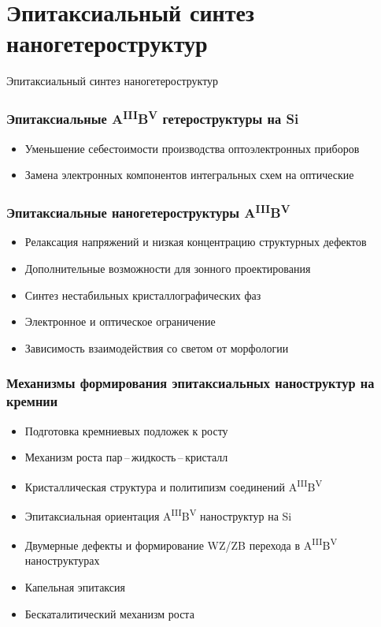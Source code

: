 \section{Эпитаксиальный синтез наногетероструктур}

\begin{frame}
	\begin{center}
		\Huge
		Эпитаксиальный синтез наногетероструктур
	\end{center}
\end{frame}

\begin{frame}
	\frametitle{Эпитаксиальные A\textsuperscript{III}B\textsuperscript{V} гетероструктуры на Si}
	\begin{itemize}
		\large
		\item Уменьшение себестоимости производства оптоэлектронных приборов
		\item Замена электронных компонентов интегральных схем на оптические
	\end{itemize}
\end{frame}

\begin{frame}
	\frametitle{Эпитаксиальные наногетероструктуры A\textsuperscript{III}B\textsuperscript{V}}
	\begin{itemize}
		\large
		\item Релаксация напряжений и низкая концентрацию структурных дефектов
		\item Дополнительные возможности для зонного проектирования
		\item Синтез нестабильных кристаллографических фаз
		\item Электронное и оптическое ограничение
		\item Зависимость взаимодействия со светом от морфологии
	\end{itemize}
\end{frame}

\begin{frame}
	\frametitle{Механизмы формирования эпитаксиальных наноструктур на кремнии}
	\begin{itemize}
		\large
		\item Подготовка кремниевых подложек к росту
		\item Механизм роста пар\,--\,жидкость\,--\,кристалл
		\item Кристаллическая структура и политипизм соединений A\textsuperscript{III}B\textsuperscript{V}
		\item Эпитаксиальная ориентация A\textsuperscript{III}B\textsuperscript{V} наноструктур на Si
		\item Двумерные дефекты и формирование WZ/ZB перехода в A\textsuperscript{III}B\textsuperscript{V} наноструктурах
		\item Капельная эпитаксия
		\item Бескаталитический механизм роста
	\end{itemize}
\end{frame}

